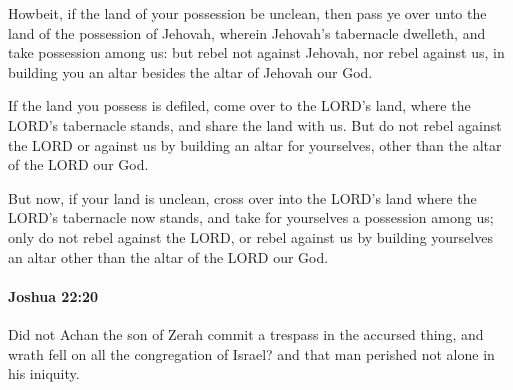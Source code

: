 			\begin{versebox}
					\item[BHS] 
					\item[ASV] Howbeit, if the land of your possession be unclean, then pass ye over unto the land of the possession of Jehovah, wherein Jehovah's tabernacle dwelleth, and take possession among us: but rebel not against Jehovah, nor rebel against us, in building you an altar besides the altar of Jehovah our God.
					\item[NIV] If the land you possess is defiled, come over to the LORD’s land, where the LORD’s tabernacle stands, and share the land with us. But do not rebel against the LORD or against us by building an altar for yourselves, other than the altar of the LORD our God.
					\item[NRSV] But now, if your land is unclean, cross over into the LORD’s land where the LORD’s tabernacle now stands, and take for yourselves a possession among us; only do not rebel against the LORD, or rebel against us by building yourselves an altar other than the altar of the LORD our God.
			\end{versebox}

		\paragraph{Joshua 22:20} %
			\label{JOSHUA-22-20}

			Did not Achan the son of Zerah commit a trespass in the accursed thing, and wrath fell on all the congregation of Israel? and that man perished not alone in his iniquity.

